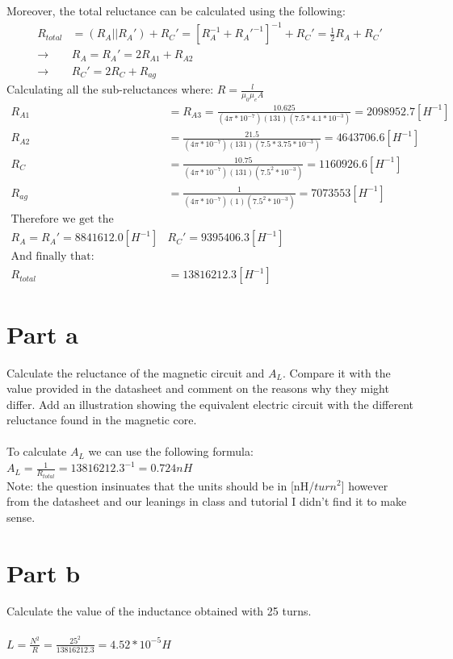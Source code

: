 \documentclass{article}
\begin{document}
Moreover, the total reluctance can be calculated using the following:
\begin{align*}
    R_{total} &= (R_A || R_A') + R_C' = [R_A^{-1} + R_A'^{-1}]^{-1} + R_C' = \frac{1}{2}R_A + R_C'\\
    \rightarrow & R_A = R_A' = 2R_{A1} + R_{A2} \\
    \rightarrow & R_C' = 2R_C + R_{ag}
\end{align*}
Calculating all the sub-reluctances where: $R = \frac{l}{\mu_0 \mu_e A}$
\begin{align*}
    R_{A1} &= R_{A3} = \frac{10.625}{(4\pi*10^{-7})(131)(7.5*4.1*10^{-3})} = 2098952.7 [H^{-1}]\\
    R_{A2} &= \frac{21.5}{(4\pi*10^{-7})(131)(7.5*3.75*10^{-3})} = 4643706.6[H^{-1}]\\
    R_{C} &= \frac{10.75}{(4\pi*10^{-7})(131)(7.5^2*10^{-3})} = 1160926.6 [H^{-1}]\\
    R_{ag}&= \frac{1}{(4\pi*10^{-7})(1)(7.5^2*10^{-3})} = 7073553[H^{-1}]\\
    \mbox{Therefore we get the following:}\\
    R_A = R_A' = 8841612.0 [H^{-1}] & R_C' = 9395406.3 [H^{-1}]\\
    \mbox{And finally that: }\\
    R_{total} &= 13816212.3 [H^{-1}]
\end{align*}

\section*{Part a}
Calculate the reluctance of the magnetic circuit and $A_L$. Compare it with the value provided in the datasheet and comment on the reasons why they might differ. Add an illustration showing the equivalent electric circuit with the different reluctance found in the magnetic core.\\
\\To calculate $A_L$ we can use the following formula:
$A_L = \frac{1}{R_{total}} = 13816212.3^{-1} = 0.724 nH$\\
Note: the question insinuates that the units should be in [nH/$turn^2$] however from the datasheet and our leanings in class and tutorial I didn't find it to make sense.

\section*{Part b}
Calculate the value of the inductance obtained with 25 turns.\\
\\$L = \frac{N^2}{R} = \frac{25^2}{13816212.3} = 4.52*10^{-5}H$
\end{document}
